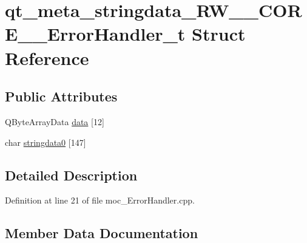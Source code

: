 \hypertarget{structqt__meta__stringdata___r_w_____c_o_r_e_____error_handler__t}{}\section{qt\+\_\+meta\+\_\+stringdata\+\_\+\+R\+W\+\_\+\+\_\+\+C\+O\+R\+E\+\_\+\+\_\+\+Error\+Handler\+\_\+t Struct Reference}
\label{structqt__meta__stringdata___r_w_____c_o_r_e_____error_handler__t}
\subsection*{Public Attributes}
\begin{DoxyCompactItemize}
\item 
Q\+Byte\+Array\+Data \hyperlink{structqt__meta__stringdata___r_w_____c_o_r_e_____error_handler__t_a26c0366a4190b24d626ab561f774dd94}{data} \mbox{[}12\mbox{]}
\item 
char \hyperlink{structqt__meta__stringdata___r_w_____c_o_r_e_____error_handler__t_a89162feda77830216ace7a3f2523f5ad}{stringdata0} \mbox{[}147\mbox{]}
\end{DoxyCompactItemize}


\subsection{Detailed Description}


Definition at line 21 of file moc\+\_\+\+Error\+Handler.\+cpp.



\subsection{Member Data Documentation}
\hypertarget{structqt__meta__stringdata___r_w_____c_o_r_e_____error_handler__t_a26c0366a4190b24d626ab561f774dd94}{}\label{structqt__meta__stringdata___r_w_____c_o_r_e_____error_handler__t_a26c0366a4190b24d626ab561f774dd94} 
